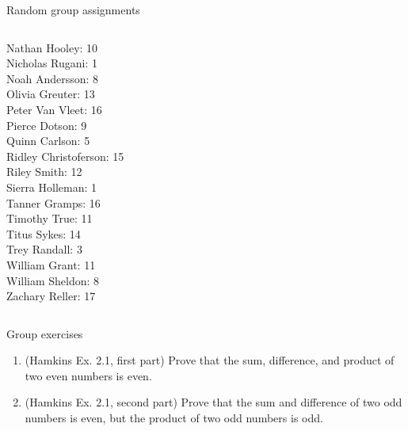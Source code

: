 \documentclass[10pt]{beamer}
\begin{document}
\begin{frame}{Random group assignments}
\begin{columns}
\begin{column}{0.33\textwidth}
Nathan Hooley: 10 \\ 
Nicholas Rugani: 1 \\ 
Noah Andersson: 8 \\ 
Olivia Greuter: 13 \\ 
Peter Van Vleet: 16 \\ 
Pierce Dotson: 9 \\ 
Quinn Carlson: 5 \\ 
Ridley Christoferson: 15 \\ 
Riley Smith: 12 \\ 
Sierra Holleman: 1 \\ 
Tanner Gramps: 16 \\ 
Timothy True: 11 \\ 
Titus Sykes: 14 \\ 
Trey Randall: 3 \\ 
William Grant: 11 \\ 
William Sheldon: 8 \\ 
Zachary Reller: 17 \\\end{column}
\end{columns}
\end{frame}

\begin{frame}{Group exercises}

\begin{enumerate}
\item (Hamkins Ex. 2.1, first part) Prove that the sum, difference, and product of two even numbers is even.
\item (Hamkins Ex. 2.1, second part) Prove that the sum and difference of two odd numbers is even, but the product of two odd numbers is odd.
\end{enumerate}
\end{frame}
\end{document}
